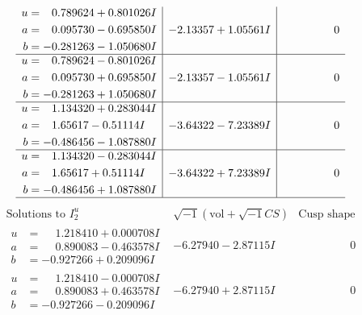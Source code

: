 \documentclass[1p]{elsarticle_modified}
\theoremstyle{definition}
\newcommand{\I}{\sqrt{-1}}
\begin{document}
$$\begin{array}{c|c|c}
\begin{aligned}
u &= \phantom{-}0.789624 + 0.801026 I \\
a &= \phantom{-}0.095730 - 0.695850 I \\
b &= -0.281263 - 1.050680 I\end{aligned}
 & -2.13357 + 1.05561 I & \phantom{-0.000000 } 0 \\ \hline\begin{aligned}
u &= \phantom{-}0.789624 - 0.801026 I \\
a &= \phantom{-}0.095730 + 0.695850 I \\
b &= -0.281263 + 1.050680 I\end{aligned}
 & -2.13357 - 1.05561 I & \phantom{-0.000000 } 0 \\ \hline\begin{aligned}
u &= \phantom{-}1.134320 + 0.283044 I \\
a &= \phantom{-}1.65617 - 0.51114 I \\
b &= -0.486456 - 1.087880 I\end{aligned}
 & -3.64322 - 7.23389 I & \phantom{-0.000000 } 0 \\ \hline\begin{aligned}
u &= \phantom{-}1.134320 - 0.283044 I \\
a &= \phantom{-}1.65617 + 0.51114 I \\
b &= -0.486456 + 1.087880 I\end{aligned}
 & -3.64322 + 7.23389 I & \phantom{-0.000000 } 0\\
 \hline 
 \end{array}$$\newpage$$\begin{array}{c|c|c}  
\text{Solutions to }I^u_{2}& \I (\text{vol} + \sqrt{-1}CS) & \text{Cusp shape}\\
 \hline 
\begin{aligned}
u &= \phantom{-}1.218410 + 0.000708 I \\
a &= \phantom{-}0.890083 - 0.463578 I \\
b &= -0.927266 + 0.209096 I\end{aligned}
 & -6.27940 - 2.87115 I & \phantom{-0.000000 } 0 \\ \hline\begin{aligned}
u &= \phantom{-}1.218410 - 0.000708 I \\
a &= \phantom{-}0.890083 + 0.463578 I \\
b &= -0.927266 - 0.209096 I\end{aligned}
 & -6.27940 + 2.87115 I & \phantom{-0.000000 } 0 \\ \hline\begin{aligned}

\end{aligned}
\end{array}$$
\end{document}
